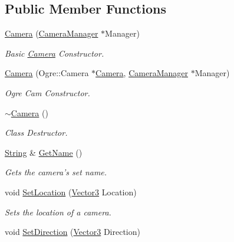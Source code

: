 \subsection*{Public Member Functions}
\begin{DoxyCompactItemize}
\item 
\hyperlink{classphys_1_1Camera_a1309e4191b22440035e360c205b81472}{Camera} (\hyperlink{classphys_1_1CameraManager}{CameraManager} $\ast$Manager)
\begin{DoxyCompactList}\small\item\em Basic \hyperlink{classphys_1_1Camera}{Camera} Constructor. \item\end{DoxyCompactList}\item 
\hyperlink{classphys_1_1Camera_a0510d4f9bf6fb195115272cbd116e8dd}{Camera} (Ogre::Camera $\ast$\hyperlink{classphys_1_1Camera}{Camera}, \hyperlink{classphys_1_1CameraManager}{CameraManager} $\ast$Manager)
\begin{DoxyCompactList}\small\item\em Ogre Cam Constructor. \item\end{DoxyCompactList}\item 
\hyperlink{classphys_1_1Camera_aa45f340a6f7ba0970aa2602a928463ea}{$\sim$Camera} ()
\begin{DoxyCompactList}\small\item\em Class Destructor. \item\end{DoxyCompactList}\item 
\hyperlink{namespacephys_aa03900411993de7fbfec4789bc1d392e}{String} \& \hyperlink{classphys_1_1Camera_aee08e3932237c76d2b59652878f2bdf6}{GetName} ()
\begin{DoxyCompactList}\small\item\em Gets the camera's set name. \item\end{DoxyCompactList}\item 
void \hyperlink{classphys_1_1Camera_ab1fb572982464212b2fa33e2df6f688b}{SetLocation} (\hyperlink{classphys_1_1Vector3}{Vector3} Location)
\begin{DoxyCompactList}\small\item\em Sets the location of a camera. \item\end{DoxyCompactList}\item 
void \hyperlink{classphys_1_1Camera_a50746cdd4f7d483edffe87d24d2b4bc6}{SetDirection} (\hyperlink{classphys_1_1Vector3}{Vector3} Direction)

\end{DoxyCompactItemize}
